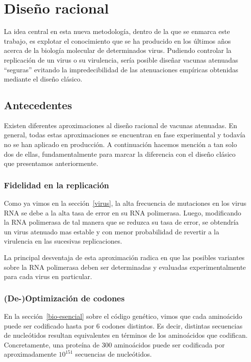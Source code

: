 \section{Dise\~no racional}

La idea central en esta nueva metodolog\'ia, dentro de la que se enmarca este
trabajo, es explotar el conocimiento que se ha producido en los \'ultimos a\~nos
acerca de la biolog\'ia molecular de determinados virus. Pudiendo controlar la
replicaci\'on de un virus o su virulencia, ser\'ia posible dise\~nar vacunas
atenuadas ``seguras'' evitando la impredecibilidad de las atenuaciones
emp\'iricas obtenidas mediante el dise\~no cl\'asico.

\subsection{Antecedentes}

Existen diferentes aproximaciones al dise\~no racional de vacunas
atenuadas\cite{Lauring10}. En general, todas estas aproximaciones se encuentran
en fase experimental y todav\'ia no se han aplicado en producci\'on. A
continuaci\'on hacemos menci\'on a tan solo dos de ellas, fundamentalmente para
marcar la diferencia con el dise\~no cl\'asico que presentamos anteriormente.

\subsubsection{Fidelidad en la replicaci\'on\cite{Vignuzzi08}} 

Como ya vimos en la secci\'on~\ref{virus}, la alta frecuencia de mutaciones en
los virus \ac{RNA} se debe a la alta tasa de error en su \ac{RNA} polimerasa.
Luego, modificando la \ac{RNA} polimerasa de tal manera que se reduzca su tasa
de error, se obtendr\'ia un virus atenuado mas estable y con menor probabilidad
de revertir a la virulencia en las sucesivas replicaciones. 

La principal desventaja de esta aproximaci\'on radica en que las
posibles variantes sobre la \ac{RNA} polimerasa deben ser determinadas y
evaluadas experimentalmente para cada virus en particular.

\subsubsection{(De-)Optimizaci\'on de codones\cite{Mueller10, Coleman08}} 

En la secci\'on~\ref{bio-esencial} sobre el c\'odigo gen\'etico, vimos que cada
amino\'acido puede ser codificado hasta por 6 codones distintos. Es decir,
distintas secuencias de nucle\'otidos resultan equivalentes en t\'erminos de los
amino\'acidos que codifican. Concretamente, una prote\'ina de 300 amino\'acidos
puede ser codificada por aproximadamente $10^{151}$ secuencias de
nucle\'otidos. 

